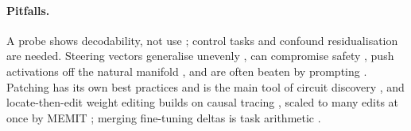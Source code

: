 \paragraph{Pitfalls.} A probe shows decodability, not use \citep{belinkov2021probing}; control tasks \citep{hewitt2019control} and confound residualisation \citep{sahoo2026format} are needed. Steering vectors generalise unevenly \citep{tan2024steering,dasilva2025steering}, can compromise safety \citep{korznikov2025rogue}, push activations off the natural manifold \citep{mishra2026nonsurjective}, and are often beaten by prompting \citep{wu2025axbench}. Patching has its own best practices \citep{zhang2023patching,heimersheim2024patching} and is the main tool of circuit discovery \citep{wang2022ioi}, and locate-then-edit weight editing builds on causal tracing \citep{meng2022rome}, scaled to many edits at once by MEMIT \citep{meng2023memit}; merging fine-tuning deltas is task arithmetic \citep{ilharco2023task}.
